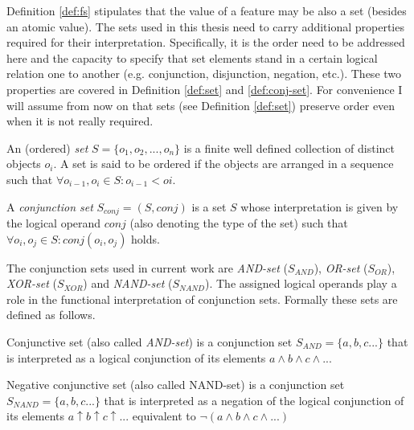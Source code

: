 Definition \ref{def:fs} stipulates that the value of a feature may be also a set (besides an atomic value). The sets used in this thesis need to carry additional properties required for their interpretation. Specifically, it is the order need to be addressed here and the capacity to specify that set elements stand in a certain logical relation one to another (e.g. conjunction, disjunction, negation, etc.). These two properties are covered in Definition \ref{def:set} and \ref{def:conj-set}.
For convenience I will assume from now on that sets (see Definition \ref{def:set}) preserve order even when it is not really required.  

\begin{definition}[Set]\label{def:set}
	An (ordered) \textit{set} $S=\{o_1,o_2,...,o_n\}$ is a finite well defined collection of distinct objects $o_{i}$. A set is said to be ordered if the objects are arranged in a sequence such that $\forall o_{i-1},o_{i} \in S: o_{i-1}<o{i}$.
\end{definition}

\begin{definition}\label{def:conj-set}
	A \textit{conjunction set} $S_{conj}=(S,conj)$ is a set $S$ whose interpretation is given by the logical operand $conj$ (also denoting the type of the set) such that $\forall o_{i},o_{j} \in S: conj(o_{i}, o_{j})$ holds.
\end{definition}

The conjunction sets used in current work are \textit{AND-set} ($S_{AND}$), \textit{OR-set} ($S_{OR}$), \textit{XOR-set} ($S_{XOR}$) and \textit{NAND-set} ($S_{NAND}$). The assigned logical operands play a role in the functional interpretation of conjunction sets. %
Formally these sets are defined as follows.

\begin{definition}\label{def:and-set}
  Conjunctive set (also called \textit{AND-set}) is a conjunction set $S_{AND}=\{a,b,c...\}$ that is interpreted as a logical conjunction of its elements $a \wedge b \wedge c \wedge ...$ 
\end{definition}

\begin{definition}\label{def:nand-set}
	Negative conjunctive set (also called NAND-set) is a conjunction set $S_{NAND}=\{a,b,c...\}$ that is interpreted as a negation of the logical conjunction of its elements $a \uparrow b \uparrow c \uparrow ...$ equivalent to $ \neg(a \wedge b \wedge c \wedge ...)$ 
\end{definition}


